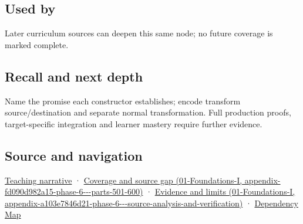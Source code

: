 \subsection{Used by}\label{appendix-380a220e2529-used-by}

Later curriculum sources can deepen this same node; no future coverage is marked complete.

\subsection{Recall and next depth}\label{appendix-380a220e2529-recall-and-next-depth}

Name the promise each constructor establishes; encode transform source/destination and separate normal transformation. Full production proofs, target-specific integration and learner mastery require further evidence.

\subsection{Source and navigation}\label{appendix-380a220e2529-source-and-navigation}

\hyperref[02-foundations-ii-ch037-types-can-remember-the-promises-that-three-components-forget]{Teaching narrative} · \href{../01-Foundations-I/main.pdf\#nameddest=appendix-fd090d982a15-phase-6---parts-501-600}{Coverage and source gap (01-Foundations-I, appendix-fd090d982a15-phase-6-\/-\/-parts-501-600)} · \href{../01-Foundations-I/main.pdf\#nameddest=appendix-a103e7846d21-phase-6---source-analysis-and-verification}{Evidence and limits (01-Foundations-I, appendix-a103e7846d21-phase-6-\/-\/-source-analysis-and-verification)} · \hyperref[appendix-4ad47bdd269a]{Dependency Map}
